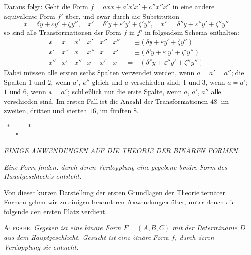 Daraus folgt: Geht die Form $f=axx+a'x'x'+a''x''x''$ in eine andere äquivalente Form
$f'$ über, und zwar durch die Substitution
\[
x=\delta y+\varepsilon y'+\zeta y'',\quad x'=\delta'y+\varepsilon'y'+\zeta'y'',\quad x''=\delta''y+\varepsilon''y'+\zeta''y''
\]
so sind alle Transformationen
der Form $f$ in $f'$ in folgendem Schema enthalten:
\[
\begin{array}{c|c|c|c|c|c|l}
x&x&x'&x'&x''&x''&=\pm(\delta y+\varepsilon y'+\zeta y'')\\
x'&x''&x&x''&x&x'&=\pm(\delta'y+\varepsilon'y'+\zeta'y'')\\
x''&x'&x''&x&x'&x&=\pm(\delta''y+\varepsilon''y'+\zeta''y'')
\end{array}
\]
Dabei müssen alle ersten sechs Spalten verwendet werden, wenn $a=a'=a''$;
die Spalten $1$ und $2$, wenn $a'$, $a''$ gleich und
$a$ verschieden sind; $1$ und $3$, wenn $a=a'$; $1$
und $6$, wenn $a=a''$; schließlich nur die erste Spalte, wenn
$a$, $a'$, $a''$ alle verschieden sind. Im ersten Fall ist
die Anzahl der Transformationen $48$, im zweiten, dritten und vierten
$16$, im fünften $8$.

\begin{center}
$\begin{array}{ccc}*&\quad&*\\&*&\end{array}$
\end{center}

\begin{center}
\textit{EINIGE ANWENDUNGEN AUF DIE THEORIE DER BINÄREN FORMEN.}
\end{center}

\begin{center}
\textit{Eine Form finden, durch deren Verdopplung eine gegebene binäre Form des Hauptgeschlechts entsteht.}
\end{center}

Von dieser kurzen Darstellung der ersten Grundlagen der Theorie ternärer
Formen gehen wir zu einigen besonderen Anwendungen über, unter denen
die folgende den ersten Platz verdient.

\textsc{Aufgabe.} \textit{Gegeben ist eine binäre Form $F=(A,B,C)$ mit der
Determinante $D$ aus dem Hauptgeschlecht. Gesucht ist eine
binäre Form $f$, durch deren Verdopplung sie entsteht.}

